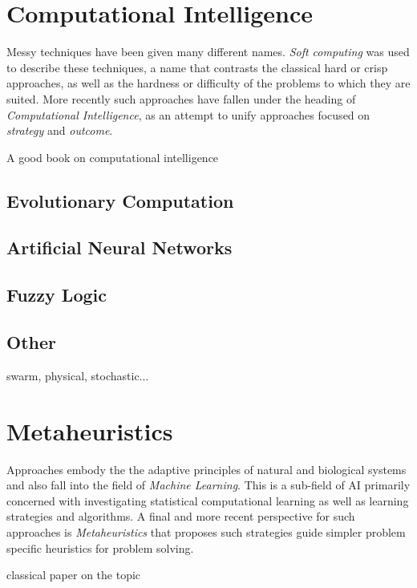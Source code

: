 \documentclass[a4paper, 11pt]{article}
\begin{document}
% 
% 
\section{Computational Intelligence}
\label{sec:computationl_intelligence}
Messy techniques have been given many different names. \emph{Soft computing} was used to describe these techniques, a name that contrasts the classical hard or crisp approaches, as well as the hardness or difficulty of the problems to which they are suited. More recently such approaches have fallen under the heading of \emph{Computational Intelligence}, as an attempt to unify approaches focused on \emph{strategy} and \emph{outcome}.

A good book on computational intelligence \cite{Engelbrecht2007}

\subsection{Evolutionary Computation}

\subsection{Artificial Neural Networks}

\subsection{Fuzzy Logic}

\subsection{Other}
swarm, physical, stochastic...

% 
% 
\section{Metaheuristics}
\label{sec:metaheuristics}
Approaches embody the the adaptive principles of natural and biological systems and also fall into the field of \emph{Machine Learning}. This is a sub-field of AI primarily concerned with investigating statistical computational learning as well as learning strategies and algorithms. A final and more recent perspective for such approaches is \emph{Metaheuristics} that proposes such strategies guide simpler problem specific heuristics for problem solving.

classical paper on the topic \cite{Blum2003}
\end{document}
